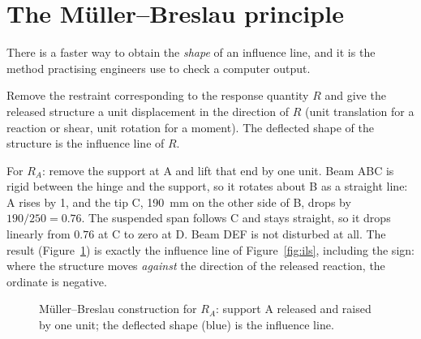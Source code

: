 \documentclass[11pt,a4paper]{article}
\begin{document}
\section{The Müller--Breslau principle}
\label{sec:mb}
There is a faster way to obtain the \emph{shape} of an influence line, and it is the method practising engineers use to check a computer output.

\begin{keybox}
Remove the restraint corresponding to the response quantity $R$ and give the released structure a unit displacement in the direction of $R$ (unit translation for a reaction or shear, unit rotation for a moment). The deflected shape of the structure is the influence line of $R$.
\end{keybox}

For $R_A$: remove the support at A and lift that end by one unit. Beam ABC is rigid between the hinge and the support, so it rotates about B as a straight line: A rises by 1, and the tip C, \SI{190}{mm} on the other side of B, drops by $190/250 = 0.76$. The suspended span follows C and stays straight, so it drops linearly from $0.76$ at C to zero at D. Beam DEF is not disturbed at all. The result (Figure~\ref{fig:mb}) is exactly the influence line of Figure~\ref{fig:ils}, including the sign: where the structure moves \emph{against} the direction of the released reaction, the ordinate is negative.

\begin{figure}[h]
\centering
{}
\caption{Müller--Breslau construction for $R_A$: support A released and raised by one unit; the deflected shape (blue) is the influence line.}
\label{fig:mb}
\end{figure}
\end{document}
